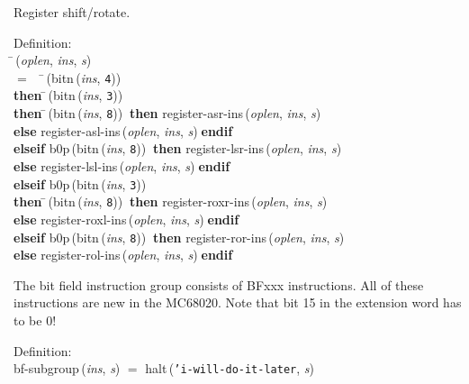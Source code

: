  Register shift/rotate.
\begin{tabbing}{\sc Definition}: \\  
\=\,({\it{oplen\/}}, {\it{ins\/}}, {\it{s\/}}) \\ 
$=$$\;\;\;\;$\=\,({\rm{bitn}}\,({\it{ins\/}}, {\tt{4}})) \\ 
{\bf then }\=\,({\rm{bitn}}\,({\it{ins\/}}, {\tt{3}})) \\ 
{\bf then }\=\,({\rm{bitn}}\,({\it{ins\/}}, {\tt{8}}))$\;\;${\bf then }{\rm{register-asr-ins}}\,({\it{oplen\/}}, {\it{ins\/}}, {\it{s\/}}) \\ 
{\bf else }{\rm{register-asl-ins}}\,({\it{oplen\/}}, {\it{ins\/}}, {\it{s\/}})$\;${\bf  endif}\- \\ 
{\bf elseif }{\rm{b0p}}\,({\rm{bitn}}\,({\it{ins\/}}, {\tt{8}}))$\;\;${\bf then }{\rm{register-lsr-ins}}\,({\it{oplen\/}}, {\it{ins\/}}, {\it{s\/}}) \\ 
{\bf else }{\rm{register-lsl-ins}}\,({\it{oplen\/}}, {\it{ins\/}}, {\it{s\/}})$\;${\bf  endif}\- \\ 
{\bf elseif }{\rm{b0p}}\,({\rm{bitn}}\,({\it{ins\/}}, {\tt{3}})) \\ 
{\bf then }\=\,({\rm{bitn}}\,({\it{ins\/}}, {\tt{8}}))$\;\;${\bf then }{\rm{register-roxr-ins}}\,({\it{oplen\/}}, {\it{ins\/}}, {\it{s\/}}) \\ 
{\bf else }{\rm{register-roxl-ins}}\,({\it{oplen\/}}, {\it{ins\/}}, {\it{s\/}})$\;${\bf  endif}\- \\ 
{\bf elseif }{\rm{b0p}}\,({\rm{bitn}}\,({\it{ins\/}}, {\tt{8}}))$\;\;${\bf then }{\rm{register-ror-ins}}\,({\it{oplen\/}}, {\it{ins\/}}, {\it{s\/}}) \\ 
{\bf else }{\rm{register-rol-ins}}\,({\it{oplen\/}}, {\it{ins\/}}, {\it{s\/}})$\;${\bf  endif}\-\-
\end{tabbing}

 The bit field instruction group consists of BFxxx instructions. All of
 these instructions are new in the MC68020.  Note that bit 15 in the 
 extension word has to be 0!
\begin{tabbing}{\sc Definition}: \\  
{\rm{bf-subgroup}}\,({\it{ins\/}}, {\it{s\/}}) $=$ {\rm{halt}}\,({\tt{'}}{\tt{i-will-do-it-later}}, {\it{s\/}})
\end{tabbing}

